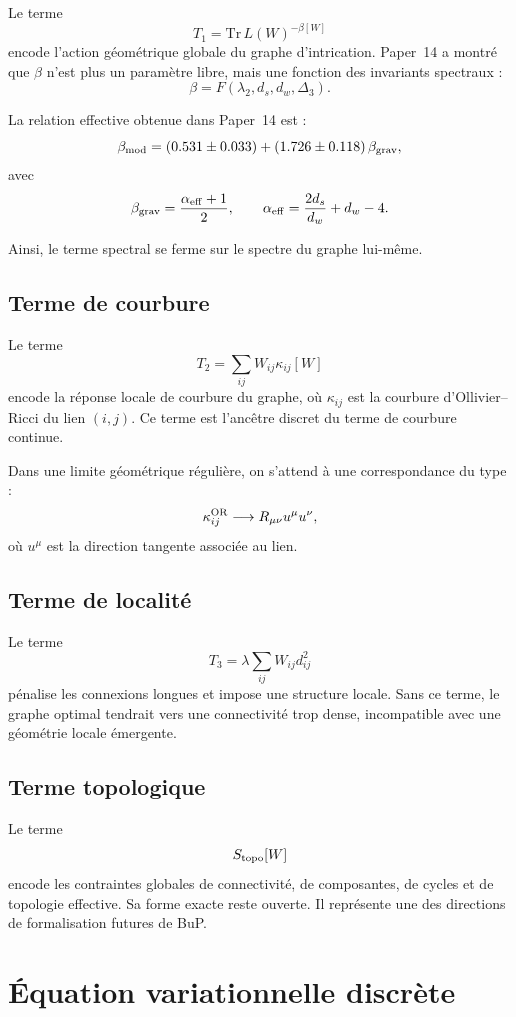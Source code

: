 \documentclass[11pt,a4paper]{article}
\begin{document}
Le terme
\[
T_1=\mathrm{Tr}\,L(W)^{-\beta[W]}
\]
encode l'action géométrique globale du graphe d'intrication. Paper~14 a
montré que \(\beta\) n'est plus un paramètre libre, mais une fonction des
invariants spectraux :
\[
\beta
=
F(\lambda_2,d_s,d_w,\Delta_3).
\]

La relation effective obtenue dans Paper~14 est :
\[
\beta_{\rm mod}
=
(0.531\pm0.033)
+
(1.726\pm0.118)\,\beta_{\rm grav},
\]
avec
\[
\beta_{\rm grav}
=
\frac{\alpha_{\rm eff}+1}{2},
\qquad
\alpha_{\rm eff}
=
\frac{2d_s}{d_w}+d_w-4.
\]

Ainsi, le terme spectral se ferme sur le spectre du graphe lui-même.

\subsection{Terme de courbure}

Le terme
\[
T_2=\sum_{ij}W_{ij}\kappa_{ij}[W]
\]
encode la réponse locale de courbure du graphe, où \(\kappa_{ij}\) est la
courbure d'Ollivier--Ricci du lien \((i,j)\). Ce terme est l'ancêtre discret
du terme de courbure continue.

Dans une limite géométrique régulière, on s'attend à une correspondance du
type :
\[
\kappa_{ij}^{\rm OR}
\longrightarrow
R_{\mu\nu}u^\mu u^\nu,
\]
où \(u^\mu\) est la direction tangente associée au lien.

\subsection{Terme de localité}

Le terme
\[
T_3=\lambda\sum_{ij}W_{ij}d_{ij}^2
\]
pénalise les connexions longues et impose une structure locale. Sans ce terme,
le graphe optimal tendrait vers une connectivité trop dense, incompatible avec
une géométrie locale émergente.

\subsection{Terme topologique}

Le terme
\[
S_{\rm topo}[W]
\]
encode les contraintes globales de connectivité, de composantes, de cycles et
de topologie effective. Sa forme exacte reste ouverte. Il représente une des
directions de formalisation futures de BuP.

\section{Équation variationnelle discrète}
\end{document}
